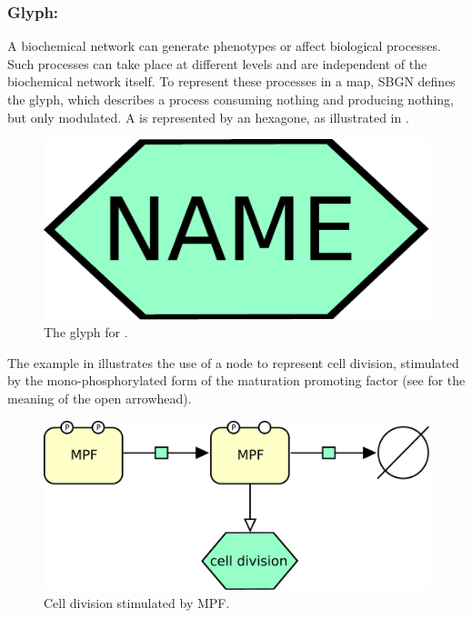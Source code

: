 \subsubsection{Glyph: }
\label{sec:phenotype}

A biochemical network can generate phenotypes or affect biological
processes.  Such processes can take place at different levels and are
independent of the biochemical network itself.  To represent these
processes in a map, SBGN defines the  glyph, which describes a process consuming nothing and producing nothing, but only modulated. A  is represented by an hexagone, as illustrated in . 

\begin{figure}[H]
  \centering
  \includegraphics[scale = 0.3]{le_images/phenotype}
  \caption{The \PD glyph for .}
  \label{fig:phenotype}
\end{figure}

The example in  illustrates the use of a  node to represent cell division, stimulated by the mono-phosphorylated form of the maturation promoting factor (see  for the meaning of the open arrowhead). 

\begin{figure}[H]
  \centering
  \includegraphics[scale = 0.5]{le_images/phenotype-MPF}
  \caption{Cell division stimulated by MPF.}
  \label{fig:phenotype-MPF}
\end{figure}


